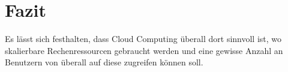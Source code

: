 \section{Fazit}
Es lässt sich festhalten, dass Cloud Computing überall dort sinnvoll ist, wo skalierbare Rechenressourcen gebraucht werden und eine gewisse Anzahl an Benutzern von überall auf diese zugreifen können soll.

